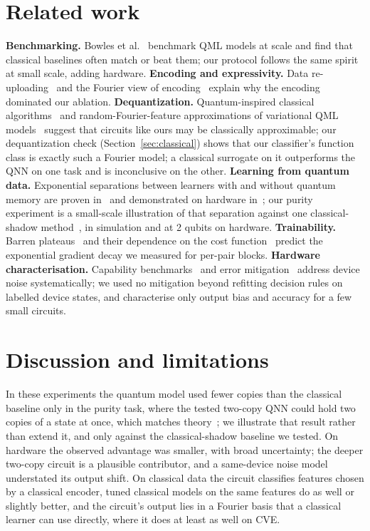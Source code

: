 \documentclass[11pt]{article}
\begin{document}
\section{Related work}
\textbf{Benchmarking.} Bowles et al.~\cite{bowles2024better} benchmark QML models at scale and find that classical baselines often match or beat them; our protocol follows the same spirit at small scale, adding hardware. \textbf{Encoding and expressivity.} Data re-uploading~\cite{perezsalinas2020reuploading} and the Fourier view of encoding~\cite{schuld2021encoding} explain why the encoding dominated our ablation. \textbf{Dequantization.} Quantum-inspired classical algorithms~\cite{tang2019dequantized} and random-Fourier-feature approximations of variational QML models~\cite{landman2022rff} suggest that circuits like ours may be classically approximable; our dequantization check (Section~\ref{sec:classical}) shows that our classifier's function class is exactly such a Fourier model; a classical surrogate on it outperforms the QNN on one task and is inconclusive on the other. \textbf{Learning from quantum data.} Exponential separations between learners with and without quantum memory are proven in~\cite{chen2021memory,aharonov2022qam} and demonstrated on hardware in~\cite{huang2022experiments}; our purity experiment is a small-scale illustration of that separation against one classical-shadow method~\cite{huang2020shadows}, in simulation and at 2 qubits on hardware. \textbf{Trainability.} Barren plateaus~\cite{mcclean2018barren} and their dependence on the cost function~\cite{cerezo2021cost} predict the exponential gradient decay we measured for per-pair blocks. \textbf{Hardware characterisation.} Capability benchmarks~\cite{proctor2022capabilities} and error mitigation~\cite{temme2017mitigation} address device noise systematically; we used no mitigation beyond refitting decision rules on labelled device states, and characterise only output bias and accuracy for a few small circuits.

\section{Discussion and limitations}
In these experiments the quantum model used fewer copies than the classical baseline only in the purity task, where the tested two-copy QNN could hold two copies of a state at once, which matches theory~\cite{huang2022experiments,chen2021memory}; we illustrate that result rather than extend it, and only against the classical-shadow baseline we tested. On hardware the observed advantage was smaller, with broad uncertainty; the deeper two-copy circuit is a plausible contributor, and a same-device noise model understated its output shift. On classical data the circuit classifies features chosen by a classical encoder, tuned classical models on the same features do as well or slightly better, and the circuit's output lies in a Fourier basis that a classical learner can use directly, where it does at least as well on CVE.
\end{document}
